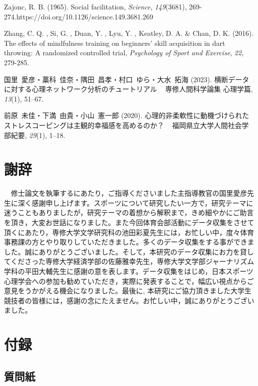 \documentclass[12pt,a4paper,xelatex,ja=standard]{bxjsarticle}
\begin{document}
Zajonc, R. B. (1965). Social facilitation, \emph{Science},
\emph{149}(3681), 269-274.https://doi.org/10.1126/science.149.3681.269

Zhang, C. Q. , Si, G. , Duan, Y. , Lyu, Y. , Keatley, D. A. \& Chan, D.
K. (2016). The effects of mindfulness training on beginners' skill
acquisition in dart throwing: A randomized controlled trial,
\emph{Psychology of Sport and Exercise}, \emph{22}, 279-285.

国里~愛彦・藁科~佳奈・隅田~昌孝・村口~ゆら・大水~拓海 (2023).
横断データに対する心理ネットワーク分析のチュートリアル ~
専修人間科学論集 心理学篇, \emph{13}(1), 51--67.

前原~未佳・下満~由貴・小山~憲一郎 (2020).
心理的非柔軟性に動機づけられたストレスコーピングは主観的幸福感を高めるのか？
~ 福岡県立大学人間社会学部紀要, \emph{29}(1), 1--18.

\endgroup

\clearpage

\hypertarget{ux8b1dux8f9e}{%
\section{謝辞}\label{ux8b1dux8f9e}}

　修士論文を執筆するにあたり，ご指導くださいました主指導教官の国里愛彦先生に深く感謝申し上げます。スポーツについて研究したい一方で，研究テーマに迷うこともありましたが，研究テーマの着想から解釈まで，きめ細やかにご助言を頂き，大変お世話になりました。また今回体育会部活動にデータ収集をさせて頂くにあたり，専修大学文学研究科の池田彩夏先生には，お忙しい中，度々体育事務課の方とやり取りしていただきました。多くのデータ収集をする事ができました。誠にありがとうございました。そして，本研究のデータ収集にお力を貸してくださった専修大学経済学部の佐藤雅幸先生，専修大学文学部ジャーナリズム学科の平田大輔先生に感謝の意を表します。データ収集をはじめ，日本スポーツ心理学会への参加も勧めていただき，実際に発表することで，幅広い視点からご意見をうかがえる機会になりました。最後に,
本研究にご協力頂きました大学生競技者の皆様には，感謝の念にたえません。お忙しい中，誠にありがとうございました。

\hypertarget{ux4ed8ux9332}{%
\section{付録}\label{ux4ed8ux9332}}

\hypertarget{ux8ceaux554fux7d19}{%
\subsection{質問紙}\label{ux8ceaux554fux7d19}}
\end{document}

